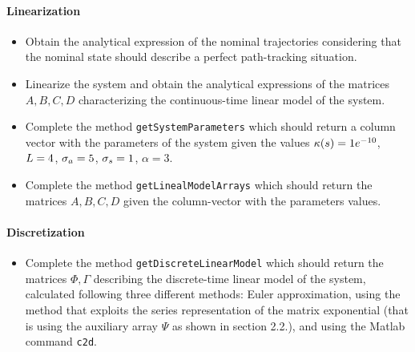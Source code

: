 \paragraph{Linearization}
	\begin{itemize}
		\setlength\itemsep{0em}
		\item Obtain the analytical expression of the nominal trajectories considering that the nominal state should describe a perfect path-tracking situation.
		\item Linearize the system and obtain the analytical expressions of the matrices $A,B,C,D$ characterizing the continuous-time linear model of the system.
		\item Complete the method \texttt{getSystemParameters} which should return a column vector with the parameters of the system given the values $\kappa(s) = 1e^{-10}$, $L = 4$, $\sigma_a = 5$, $\sigma_s = 1$, $\alpha = 3$.
		\item Complete the method \texttt{getLinealModelArrays} which should return the matrices $A,B,C,D$ given the column-vector with the parameters values. 
	\end{itemize}
\paragraph{Discretization}	
	\begin{itemize}
		\setlength\itemsep{0em}
		\item Complete the method \texttt{getDiscreteLinearModel} which should return the matrices $\Phi, \Gamma$ describing the discrete-time linear model of the system, calculated following three different methods: Euler approximation, using the method that exploits the series representation of the matrix exponential (that is using the auxiliary array $\Psi$ as shown in section 2.2.), and using the Matlab command \texttt{c2d}.
	\end{itemize}
